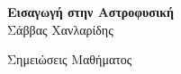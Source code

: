 \begin{titlepage}

\begingroup
\thispagestyle{empty}
\centering
\vspace*{5cm}
\par\normalfont\fontsize{35}{35}\sffamily\selectfont
\textbf{Εισαγωγή στην Αστροφυσική}\\
{\LARGE Σάββας Χανλαρίδης}\par %
\vspace*{1cm}
{\Huge Σημειώσεις Μαθήματος}\par %
\endgroup






    

\end{titlepage}

